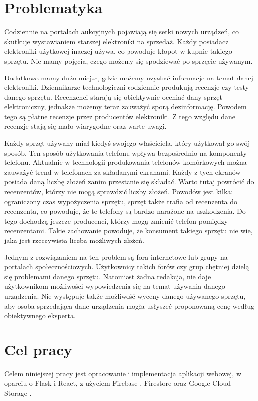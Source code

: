 \section{Problematyka}
Codziennie na portalach aukcyjnych pojawiają się setki nowych urządzeń, co skutkuje wystawianiem starszej elektroniki na sprzedaż. Każdy posiadacz elektroniki użytkowej inaczej używa, co powoduje kłopot w kupnie takiego sprzętu. Nie mamy pojęcia, czego możemy się spodziewać po sprzęcie używanym.

Dodatkowo mamy dużo miejsc, gdzie możemy uzyskać informacje na temat danej elektroniki. Dziennikarze technologiczni codziennie produkują recenzje czy testy danego sprzętu. Recenzenci starają się obiektywnie oceniać dany sprzęt elektroniczny, jednakże możemy teraz zauważyć sporą dezinformację. Powodem tego są płatne recenzje przez producentów elektroniki. Z tego względu dane recenzje stają się mało wiarygodne oraz warte uwagi.

Każdy sprzęt używany miał kiedyś swojego właściciela, który użytkował go swój sposób. Ten sposób użytkowania telefonu wpływa bezpośrednio na komponenty telefonu. Aktualnie w technologii produkowania telefonów komórkowych można zauważyć trend w telefonach za składanymi ekranami. Każdy z tych ekranów posiada daną liczbę złożeń zanim przestanie się składać. Warto tutaj powrócić do recenzentów, którzy nie mogą  sprawdzić liczby złożeń. Powodów jest kilka: ograniczony czas wypożyczenia sprzętu, sprzęt także trafia od recenzenta do recenzenta, co powoduje, że te telefony są bardzo narażone na uszkodzenia. Do tego dochodzą jeszcze producenci, którzy mogą zmienić telefon pomiędzy recenzentami. Takie zachowanie powoduje, że konsument takiego sprzętu nie wie, jaka jest rzeczywista liczba możliwych złożeń.

Jednym z rozwiązaniem na ten problem są fora internetowe lub grupy na portalach społecznościowych. Użytkownicy takich forów czy grup chętniej dzielą się problemami danego sprzętu. Natomiast żadna redakcja, nie daje użytkownikom możliwości wypowiedzenia się na temat używania danego urządzenia. Nie występuje także możliwość wyceny danego używanego sprzętu, aby osoba sprzedająca dane urządzenia mogła usłyszeć proponowaną cenę według obiektywnego eksperta.

\section{Cel pracy}
Celem niniejszej pracy jest opracowanie i implementacja aplikacji webowej, w oparciu o Flask i React, z użyciem Firebase \cite*{firebase}, Firestore \cite*{firestore} oraz Google Cloud Storage \cite*{cloud_storage}.

